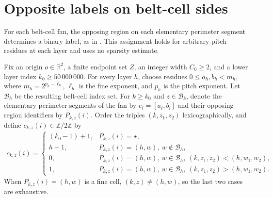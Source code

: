 \section{Opposite labels on belt-cell sides}
\label{sec:area_law_belt_fan_colors}

For each belt-cell fan, the opposing region on each elementary perimeter segment
determines a binary label, as in \cite[Section~11]{OpenAI2026AreaLaw}. This
assignment holds for arbitrary pitch residues at each layer and uses no sparsity
estimate.


\begin{definition}
    \label{def:area_law_belt_fan_color}
    \leanok
    Fix an origin $o\in\mathbb R^2$, a finite endpoint set $Z$,
    an integer width $C_0\ge2$, and a lower layer index $k_0\ge50\,000\,000$.
    For every layer $h$, choose residues $0\le a_h,b_h<m_h$, where
    $m_h=2^{p_h-\ell_h}$, $\ell_h$ is the fine exponent, and $p_h$ is the
    pitch exponent. Let $\mathcal B_h$ be the resulting belt-cell
    index set. For $k\ge k_0$ and $z\in\mathcal B_k$, denote the elementary
    perimeter segments of the fan by $e_i=[a_i,b_i]$ and their opposing region
    identifiers by $P_{k,z}(i)$. Order the triples $(k,z_1,z_2)$
    lexicographically, and define $c_{k,z}(i)\in\mathbb Z/2\mathbb Z$ by
    \begin{align}
        c_{k,z}(i)=
        \begin{cases}
            (k_0-1)+1, & P_{k,z}(i)=\star,                                              \\
            h+1,       & P_{k,z}(i)=(h,w),\ w\notin\mathcal B_h,                        \\
            0,         & P_{k,z}(i)=(h,w),\ w\in\mathcal B_h,\ (k,z_1,z_2)<(h,w_1,w_2), \\
            1,         & P_{k,z}(i)=(h,w),\ w\in\mathcal B_h,\ (k,z_1,z_2)>(h,w_1,w_2).
        \end{cases}
    \end{align}
    When $P_{k,z}(i)=(h,w)$ is a fine cell, $(k,z)\ne(h,w)$, so the last two
    cases are exhaustive.
\end{definition}

